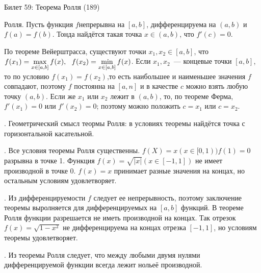 Билет 59: Теорема Ролля
(189)

\T \q Ролля. Пусть функция $f$непрерывна на $[a, b]$, дифференцируема на $(a, b)$ и $f(a) = f(b)$. Тонда найдётся такая точка $x \in (a, b)$, что $f'(c) = 0$.

\D По теореме Вейерштрасса, существуют точки $x_1, x_2 \in [a, b]$, что $f(x_1) = \displaystyle \max\limits^{}_{x \in [a, b]} f(x),\ \  f(x_2) = \displaystyle \min\limits^{}_{x \in [a, b]} f(x)$. Если $x_1, x_2$~--- концевые точки $[a, b]$, то по условию $f(x_1) = f(x_2)$,то есть наибольшее и наименьшее значения $f$ совпадают, поэтому $f$ постоянна на $[a, n]$ и в качестве $c$ можно взять любую точку $(a, b)$. Если же $x_1$ или $x_2$ лежит в $(a, b)$, то, по теореме Ферма, $f'(x_1) = 0$ или $f'(x_2) = 0$; поэтому можно положить $c = x_1$ или $c = x_2$.

. Геометрический смысл теормы Ролля: в условиях теоремы найдётся точка с горизонтальной касательной.

. Все условия теоремы Ролля существенны. $f(X) = x (x \in [0, 1)) f(1) = 0$ разрывна в точке 1. Функция $f(x) =\sqrt{|x|} (x \in [-1, 1])$ не имеет производной в точке 0. $f(x) = x$ принимает разные значения на концах, но остальным условиям удовлетворяет.

. Из дифференцируемости $f$ следует ее непрерывность, поэтому заключение теоремы выролняется для дифференцируемых на $[a, b]$ функций. В теореме Ролля функции разрешается не иметь производной на концах. Так отрезок $f(x) = \sqrt{1 - x^2}$ не дифференцируема на концах отрезка $[-1, 1 ]$, но условиям теоремы удовлетворяет.

. Из теоремы Ролля следует, что между любыми двумя нулями дифференцируемой функции всегда лежит нольеё производной.